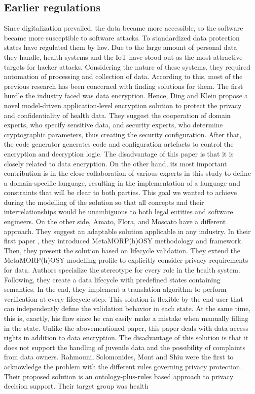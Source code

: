 \documentclass[11pt,english]{article}
\begin{document}
\subsection{Earlier regulations}
Since digitalization prevailed, the data became more accessible, so the software became more susceptible to software attacks. To standardized
data protection states have regulated them by law. Due to the large amount of personal data they handle, health systems and the IoT \cite{iot} have stood out as the most attractive targets for hacker attacks. Considering the nature of these systems, they required automation of processing and collection of data. According to this, most of the previous research has been concerned with finding solutions for them. \newline The first hurdle the industry faced was data encryption. Hence, Ding and Klein \cite{encryptionLevel} propose a novel model-driven application-level encryption solution to protect the privacy and confidentiality of health data. They suggest the cooperation of domain experts, who specify sensitive data, and security experts, who determine cryptographic parameters, thus creating the security configuration. After that, the code generator generates code and configuration artefacts to control the encryption and decryption logic. The disadvantage of this paper is that it is closely related to data encryption. On the other hand, its most important contribution is in the close collaboration of various experts in this study to define a domain-specific language, resulting in the implementation of a language and constraints that will be clear to both parties. This goal we wanted to achieve during the modelling of the solution so that all concepts and their interrelationships would be unambiguous to both legal entities and software engineers. On the other side, Amato, Flora, and Moscato have a different approach. They suggest an adaptable solution applicable in any industry. In their first paper \cite{6245777}, they introduced MetaMORP(h)OSY methodology and framework. Then, they present the solution \cite{amato2015model} based on lifecycle validation. They extend the MetaMORP(h)OSY modelling profile to explicitly consider privacy requirements for data. Authors specialize the stereotype for every role in the health system. Following, they create a data lifecycle with predefined states containing semantics. In the end, they implement a translation algorithm to perform verification at every lifecycle step. This solution is flexible by the end-user that can independently define the validation behavior in each state. At the same time, this is, exactly, his flaw since he can easily make a mistake when manually filling in the state. Unlike the abovementioned paper, this paper deals with data access rights in addition to data encryption. The disadvantage of this solution is that it does not support the handling of juvenile data and the possibility of complaints from data owners. \newline Rahmouni, Solomonides, Mont and Shiu \cite{rahmouni2011model} were the first to acknowledge the problem with the different rules governing privacy protection. Their proposed solution is an ontology-plus-rules based approach to privacy decision support. Their target group was health 
\end{document}
